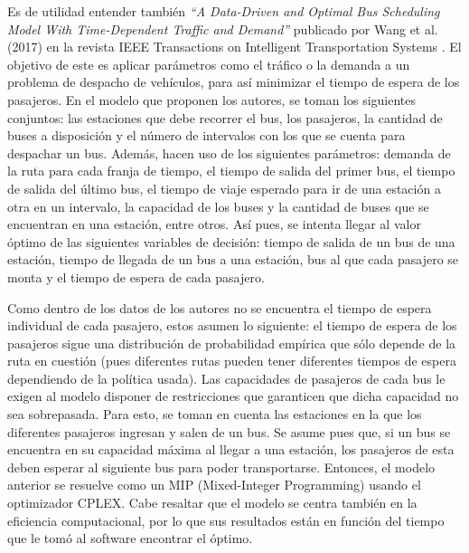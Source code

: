 \documentclass[preprint,11pt]{elsarticle}
\begin{document}
Es de utilidad entender también \textit{“A Data-Driven and Optimal Bus Scheduling Model With Time-Dependent Traffic and Demand”} publicado por Wang et al. (2017) en la revista IEEE Transactions on Intelligent Transportation Systems \parencite{wang2017}. El objetivo de este es aplicar parámetros como el tráfico o la demanda a un problema de despacho de vehículos, para así minimizar el tiempo de espera de los pasajeros. En el modelo que proponen los autores, se toman los siguientes conjuntos: las estaciones que debe recorrer el bus, los pasajeros, la cantidad de buses a disposición y el número de intervalos con los que se cuenta para despachar un bus. Además, hacen uso de los siguientes parámetros: demanda de la ruta para cada franja de tiempo, el tiempo de salida del primer bus, el tiempo de salida del último bus, el tiempo de viaje esperado para ir de una estación a otra en un intervalo, la capacidad de los buses y la cantidad de buses que se encuentran en una estación, entre otros. Así pues, se intenta llegar al valor óptimo de las siguientes variables de decisión: tiempo de salida de un bus de una estación, tiempo de llegada de un bus a una estación, bus al que cada pasajero se monta y el tiempo de espera de cada pasajero. 

Como dentro de los datos de los autores no se encuentra el tiempo de espera individual de cada pasajero, estos asumen lo siguiente: el tiempo de espera de los pasajeros sigue una distribución de probabilidad empírica que sólo depende de la ruta en cuestión (pues diferentes rutas pueden tener diferentes tiempos de espera dependiendo de la política usada). Las capacidades de pasajeros de cada bus le exigen al modelo disponer de restricciones que garanticen que dicha capacidad no sea sobrepasada. Para esto, se toman en cuenta las estaciones en la que los diferentes pasajeros ingresan y salen de un bus. Se asume pues que, si un bus se encuentra en su capacidad máxima al llegar a una estación, los pasajeros de esta deben esperar al siguiente bus para poder transportarse. Entonces, el modelo anterior se resuelve como un MIP (Mixed-Integer Programming) usando el optimizador CPLEX. Cabe resaltar que el modelo se centra también en la eficiencia computacional, por lo que sus resultados están en función del tiempo que le tomó al software encontrar el óptimo.
\end{document}
